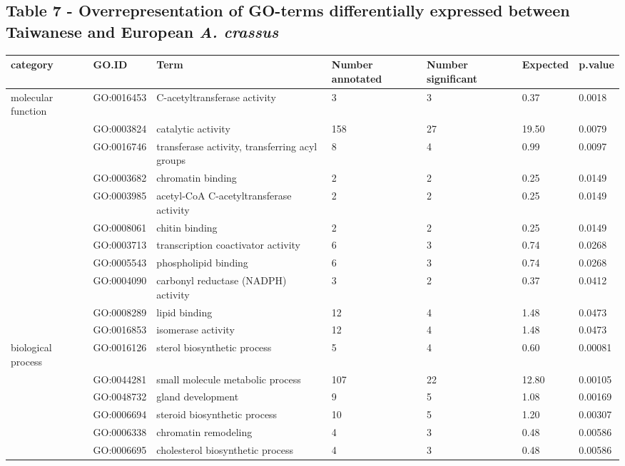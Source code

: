 \documentclass[10pt]{bmc_article}
\newenvironment{bmcformat}{\begin{raggedright}\baselineskip20pt\sloppy\setboolean{publ}{false}}{\end{raggedright}\baselineskip20pt\sloppy}
\begin{document}
\begin{bmcformat}
\subsection*{Table 7 - Overrepresentation of GO-terms differentially
  expressed between Taiwanese and European \textit{A. crassus}}

\begin{longtable}{p{1.7cm}lp{4.5cm}p{1cm}p{1cm}ll}
 category & GO.ID & Term & Number annotated & Number significant & Expected & p.value \\ 
  \hline
molecular function & GO:0016453 & C-acetyltransferase activity &   3 &   3 & 0.37 & 0.0018 \\ 
   & GO:0003824 & catalytic activity & 158 &  27 & 19.50 & 0.0079 \\ 
   & GO:0016746 & transferase activity, transferring acyl groups &   8 &   4 & 0.99 & 0.0097 \\ 
   & GO:0003682 & chromatin binding &   2 &   2 & 0.25 & 0.0149 \\ 
   & GO:0003985 & acetyl-CoA C-acetyltransferase activity &   2 &   2 & 0.25 & 0.0149 \\ 
   & GO:0008061 & chitin binding &   2 &   2 & 0.25 & 0.0149 \\ 
   & GO:0003713 & transcription coactivator activity &   6 &   3 & 0.74 & 0.0268 \\ 
   & GO:0005543 & phospholipid binding &   6 &   3 & 0.74 & 0.0268 \\ 
   & GO:0004090 & carbonyl reductase (NADPH) activity &   3 &   2 & 0.37 & 0.0412 \\ 
   & GO:0008289 & lipid binding &  12 &   4 & 1.48 & 0.0473 \\ 
   & GO:0016853 & isomerase activity &  12 &   4 & 1.48 & 0.0473 \\ 
   \hline
biological process & GO:0016126 & sterol biosynthetic process &   5 &   4 & 0.60 & 0.00081 \\ 
   & GO:0044281 & small molecule metabolic process & 107 &  22 & 12.80 & 0.00105 \\ 
   & GO:0048732 & gland development &   9 &   5 & 1.08 & 0.00169 \\ 
   & GO:0006694 & steroid biosynthetic process &  10 &   5 & 1.20 & 0.00307 \\ 
   & GO:0006338 & chromatin remodeling &   4 &   3 & 0.48 & 0.00586 \\ 
   & GO:0006695 & cholesterol biosynthetic process &   4 &   3 & 0.48 & 0.00586 \\ 

\end{longtable}
\end{bmcformat}
\end{document}

